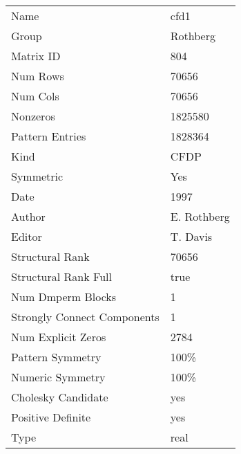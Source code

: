 \begin{tabular}{ll}
\midrule
                       Name &                                 cfd1 \\
                      Group &                             Rothberg \\
                  Matrix ID &                                  804 \\
                   Num Rows &                                70656 \\
                   Num Cols &                                70656 \\
                   Nonzeros &                              1825580 \\
            Pattern Entries &                              1828364 \\
                       Kind & CFDP \\
                  Symmetric &                                  Yes \\
                       Date &                                 1997 \\
                     Author &                          E. Rothberg \\
                     Editor &                             T. Davis \\
            Structural Rank &                                70656 \\
       Structural Rank Full &                                 true \\
          Num Dmperm Blocks &                                    1 \\
Strongly Connect Components &                                    1 \\
         Num Explicit Zeros &                                 2784 \\
           Pattern Symmetry &                                 100\% \\
           Numeric Symmetry &                                 100\% \\
         Cholesky Candidate &                                  yes \\
          Positive Definite &                                  yes \\
                       Type &                                 real \\
\bottomrule
\end{tabular}
